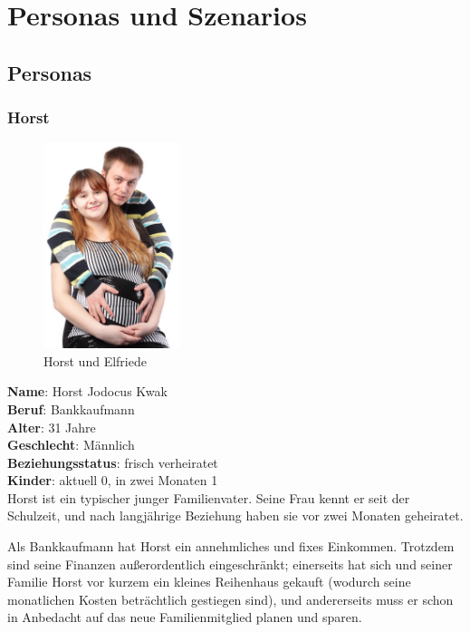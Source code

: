 \section{Personas und Szenarios}

\subsection{Personas}

\subsubsection{Horst}

\begin{figure}
\centering
\includegraphics[width=4cm]{img/horst}
\caption{Horst und Elfriede}
\label{fig:horst_und_elfriede}
\end{figure}

\textbf{Name}: Horst Jodocus Kwak \\
\textbf{Beruf}: Bankkaufmann \\
\textbf{Alter}: 31 Jahre \\
\textbf{Geschlecht}: M\"annlich \\
\textbf{Beziehungsstatus}: frisch verheiratet \\
\textbf{Kinder}: aktuell 0, in zwei Monaten 1 \\

Horst ist ein typischer junger Familienvater. Seine Frau kennt er seit der Schulzeit,
und nach langj\"ahrige Beziehung haben sie vor zwei Monaten geheiratet.

Als Bankkaufmann
hat Horst ein annehmliches und fixes Einkommen. Trotzdem sind seine Finanzen au\ss erordentlich eingeschr\"ankt;
einerseits hat sich und seiner Familie Horst vor kurzem ein kleines Reihenhaus gekauft (wodurch seine
monatlichen Kosten betr\"achtlich gestiegen sind), und andererseits muss er schon in Anbedacht auf das neue
Familienmitglied planen und sparen.

